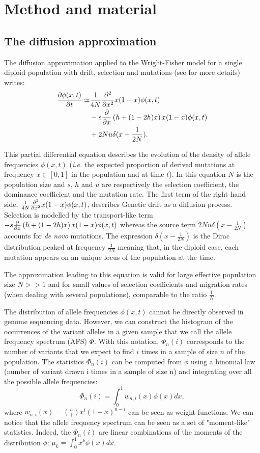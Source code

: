 \section{Method and material}

\subsection{The diffusion approximation}
The diffusion approximation applied to the Wright-Fisher model for a single diploid population with drift, selection and mutations (see \cite{kimura1964} for more details) writes:
\begin{equation}
	\begin{split}
	\frac{\partial \phi(x,t)}{\partial t}\simeq &\frac{1}{4 N} \frac{\partial^2 }{\partial x^2} x(1-x) \phi(x,t) \\&-s \frac{\partial }{\partial x} \left(h+(1-2h)x \right)x (1-x) \phi(x,t) \\&+ 2 N u \delta(x-\frac{1}{2 N}).
	\end{split}
	\label{eq:diff}
\end{equation}

This partial differential equation describes the evolution of the density of allele frequencies $\phi(x,t)$ (\textit{i.e.} the expected proportion of derived mutations at frequency $x \in [0, 1]$ in the population and at time $t$). In this equation $N$ is the population size and $s$, $h$ and $u$ are respectively the selection coefficient, the dominance coefficient and the mutation rate.
The first term of the right hand side, $\frac{1}{4 N} \frac{\partial^2 }{\partial x^2} x(1-x) \phi(x,t)$, describes Genetic drift as a diffusion process. Selection is modelled by the transport-like term $-s \frac{\partial }{\partial x} \left(h+(1-2h)x \right)x (1-x) \phi(x,t)$ whereas the source term $2 N u \delta(x-\frac{1}{2 N})$ accounts for \textit{de novo} mutations. The expression $\delta(x-\frac{1}{2 N})$ is the Dirac distribution peaked at frequency $\frac{1}{2 N}$ meaning that, in the diploid case, each mutation appears on an unique locus of the population at the time.

The approximation leading to this equation is valid for large effective population size $N >> 1$ and for small values of selection coefficients and migration rates (when dealing with several populations), comparable to the ratio $\frac{1}{N}$. 

The distribution of allele frequencies $\phi(x,t)$ cannot be directly observed in genome sequencing data. However, we can construct the histogram of the occurrences of the variant alleles in a given sample that we call the allele frequency spectrum (AFS) $\Phi$. With this notation, $\Phi_n(i)$ corresponds to the number of variants that we expect to find $i$ times in a sample of size $n$ of the population. The statistics $\Phi_n(i)$ can be computed from $\phi$ using a binomial law (number of variant drawn i times in a sample of size n) and integrating over all the possible allele frequencies: 
$$
	 \Phi_n(i) = \int_0^1 w_{n,i}(x) \phi(x) dx,
$$
where $w_{n,i}(x) = {n\choose i}  x^i (1-x)^{n-i}$ can be seen as weight functions.
We can notice that the allele frequency spectrum can be seen as a set of "moment-like" statistics. Indeed, the $\Phi_n(i)$ are linear combinations of the moments of the distribution $\phi$: $\mu_k = \int_0^1 x^k \phi(x)dx$.

